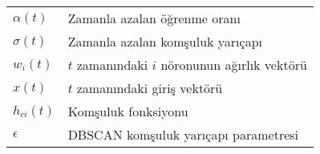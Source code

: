 \begin{spacing}{1.0}
\begin{longtable}{@{}p{} p{}@{}}
\\
$\alpha(t)$  &	Zamanla azalan öğrenme oranı \\[1ex]
$\sigma(t)$  &	Zamanla azalan komşuluk yarıçapı \\[1ex]
$w_i(t)$  &	$t$ zamanındaki $i$ nöronunun ağırlık vektörü \\[1ex]
$x(t)$  &	$t$ zamanındaki giriş vektörü \\[1ex]
$h_{ci}(t)$  &	Komşuluk fonksiyonu \\[1ex]
$\epsilon$ & DBSCAN komşuluk yarıçapı parametresi \\[1ex]
\end{longtable}
\end{spacing}